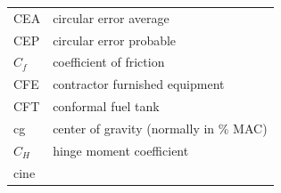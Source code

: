 \documentclass[
]{book}
\begin{document}
\begin{longtable}[]{@{}ll@{}}
\begin{minipage}[t]{0.47\columnwidth}\raggedright
CEA\strut
\end{minipage} & \begin{minipage}[t]{0.47\columnwidth}\raggedright
circular error average\strut
\end{minipage}\tabularnewline
\begin{minipage}[t]{0.47\columnwidth}\raggedright
CEP\strut
\end{minipage} & \begin{minipage}[t]{0.47\columnwidth}\raggedright
circular error probable\strut
\end{minipage}\tabularnewline
\begin{minipage}[t]{0.47\columnwidth}\raggedright
\(C_f\)\strut
\end{minipage} & \begin{minipage}[t]{0.47\columnwidth}\raggedright
coefficient of friction\strut
\end{minipage}\tabularnewline
\begin{minipage}[t]{0.47\columnwidth}\raggedright
CFE\strut
\end{minipage} & \begin{minipage}[t]{0.47\columnwidth}\raggedright
contractor furnished equipment\strut
\end{minipage}\tabularnewline
\begin{minipage}[t]{0.47\columnwidth}\raggedright
CFT\strut
\end{minipage} & \begin{minipage}[t]{0.47\columnwidth}\raggedright
conformal fuel tank\strut
\end{minipage}\tabularnewline
\begin{minipage}[t]{0.47\columnwidth}\raggedright
cg\strut
\end{minipage} & \begin{minipage}[t]{0.47\columnwidth}\raggedright
center of gravity (normally in \% MAC)\strut
\end{minipage}\tabularnewline
\begin{minipage}[t]{0.47\columnwidth}\raggedright
\(C_H\)\strut
\end{minipage} & \begin{minipage}[t]{0.47\columnwidth}\raggedright
hinge moment coefficient\strut
\end{minipage}\tabularnewline
\begin{minipage}[t]{0.47\columnwidth}\raggedright
cine\strut
\end{minipage} & \begin{minipage}[t]{0.47\columnwidth}\raggedright

\end{minipage}
\end{longtable}
\end{document}
